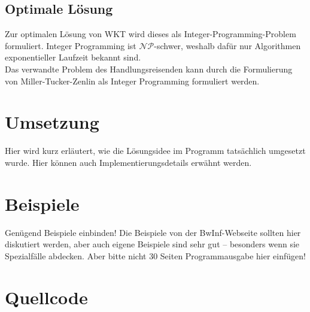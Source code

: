 \documentclass[a4paper,10pt,ngerman]{scrartcl}
\begin{document}
 \subsection{Optimale Lösung}
 Zur optimalen Lösung von WKT wird dieses als Integer-Programming-Problem formuliert. Integer Programming ist
 $\mathcal{NP}$-schwer, weshalb dafür nur Algorithmen exponentieller Laufzeit bekannt sind. \\
Das verwandte Problem des Handlungsreisenden kann durch die Formulierung von Miller-Tucker-Zenlin als Integer Programming
formuliert werden. 
 \section{Umsetzung}
Hier wird kurz erläutert, wie die Lösungsidee im Programm tatsächlich umgesetzt
wurde. Hier können auch Implementierungsdetails erwähnt werden.

\section{Beispiele}
Genügend Beispiele einbinden! Die Beispiele von der BwInf-Webseite sollten hier
diskutiert werden, aber auch eigene Beispiele sind sehr gut – besonders wenn
sie Spezialfälle abdecken. Aber bitte nicht 30 Seiten Programmausgabe hier
einfügen!

\section{Quellcode}
\end{document}
